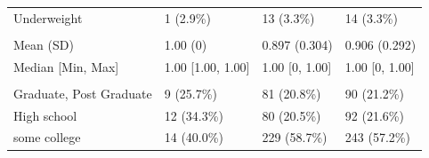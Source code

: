 \documentclass[
  12pt,
]{article}
\begin{document}
\begin{table}
\begin{tabular}[t]{llll}
\hspace{1em}Underweight & 1 (2.9\%) & 13 (3.3\%) & 14 (3.3\%)\\
\addlinespace[0.3em]
\multicolumn{4}{l}{\textbf{Adh}}\\
\hspace{1em}Mean (SD) & 1.00 (0) & 0.897 (0.304) & 0.906 (0.292)\\
\hspace{1em}Median [Min, Max] & 1.00 [1.00, 1.00] & 1.00 [0, 1.00] & 1.00 [0, 1.00]\\
\addlinespace[0.3em]
\multicolumn{4}{l}{\textbf{Edu}}\\
\hspace{1em}Graduate, Post Graduate & 9 (25.7\%) & 81 (20.8\%) & 90 (21.2\%)\\
\hspace{1em}High school & 12 (34.3\%) & 80 (20.5\%) & 92 (21.6\%)\\
\hspace{1em}some college & 14 (40.0\%) & 229 (58.7\%) & 243 (57.2\%)\\
\bottomrule
\end{tabular}
\end{table}
\end{document}
